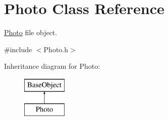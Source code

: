 \hypertarget{classPhoto}{\section{Photo Class Reference}
\label{classPhoto}
}


\hyperlink{classPhoto}{Photo} file object.  




{\ttfamily \#include $<$Photo.\-h$>$}

Inheritance diagram for Photo\-:\begin{figure}[H]
\begin{center}
\leavevmode
\includegraphics[height=2.000000cm]{classPhoto}
\end{center}
\end{figure}
